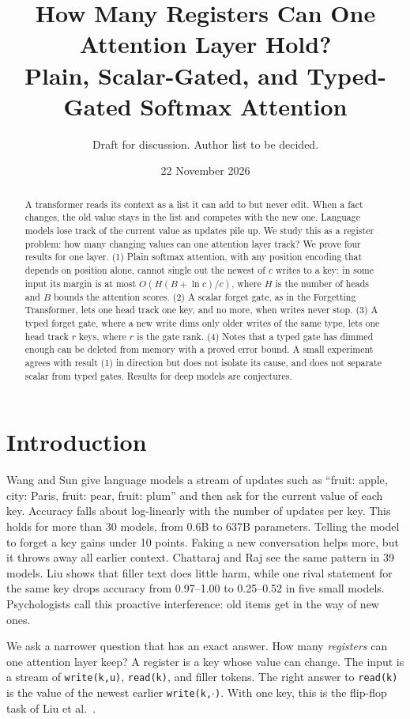 \documentclass[10pt]{article}
\title{How Many Registers Can One Attention Layer Hold?\\ Plain, Scalar-Gated, and Typed-Gated Softmax Attention}
\author{Draft for discussion. Author list to be decided.}
\date{22 November 2026}
\theoremstyle{definition}
\theoremstyle{remark}
\begin{document}
\maketitle

\begin{abstract}
A transformer reads its context as a list it can add to but never edit. When a fact changes, the old value stays in the list and competes with the new one. Language models lose track of the current value as updates pile up. We study this as a register problem: how many changing values can one attention layer track? We prove four results for one layer. (1) Plain softmax attention, with any position encoding that depends on position alone, cannot single out the newest of $c$ writes to a key: in some input its margin is at most $O(H(B + \ln c)/c)$, where $H$ is the number of heads and $B$ bounds the attention scores. (2) A scalar forget gate, as in the Forgetting Transformer, lets one head track one key, and no more, when writes never stop. (3) A typed forget gate, where a new write dims only older writes of the same type, lets one head track $r$ keys, where $r$ is the gate rank. (4) Notes that a typed gate has dimmed enough can be deleted from memory with a proved error bound. A small experiment agrees with result (1) in direction but does not isolate its cause, and does not separate scalar from typed gates. Results for deep models are conjectures.
\end{abstract}

\section{Introduction}

Wang and Sun \cite{pillm} give language models a stream of updates such as ``fruit: apple, city: Paris, fruit: pear, fruit: plum'' and then ask for the current value of each key. Accuracy falls about log-linearly with the number of updates per key. This holds for more than 30 models, from 0.6B to 637B parameters. Telling the model to forget a key gains under 10 points. Faking a new conversation helps more, but it throws away all earlier context. Chattaraj and Raj \cite{rememberfirst} see the same pattern in 39 models. Liu \cite{lengthcheap} shows that filler text does little harm, while one rival statement for the same key drops accuracy from 0.97--1.00 to 0.25--0.52 in five small models. Psychologists call this proactive interference: old items get in the way of new ones.

We ask a narrower question that has an exact answer. How many \emph{registers} can one attention layer keep? A register is a key whose value can change. The input is a stream of \texttt{write(k,u)}, \texttt{read(k)}, and filler tokens. The right answer to \texttt{read(k)} is the value of the newest earlier \texttt{write(k,$\cdot$)}. With one key, this is the flip-flop task of Liu et al.\ \cite{flipflop}.
\end{document}

